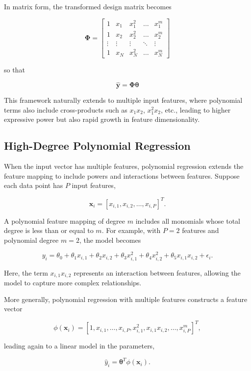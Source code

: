 \documentclass{article}
\begin{document}
In matrix form, the transformed design matrix becomes

\[
\mathbf{\Phi} =
\begin{bmatrix}
1 & x_1 & x_1^2 & \dots & x_1^m \\
1 & x_2 & x_2^2 & \dots & x_2^m \\
\vdots & \vdots & \vdots & \ddots & \vdots \\
1 & x_N & x_N^2 & \dots & x_N^m
\end{bmatrix}
\]

so that

\[
\hat{\mathbf{y}} = \mathbf{\Phi}\boldsymbol{\theta}
\]

This framework naturally extends to multiple input features, where polynomial terms also include cross-products such as $x_1 x_2$, $x_1^2 x_2$, etc., leading to higher expressive power but also rapid growth in feature dimensionality.

\subsection{High-Degree Polynomial Regression}

When the input vector has multiple features, polynomial regression extends the feature mapping to include powers and interactions between features. Suppose each data point has $P$ input features,

\[
\mathbf{x}_i = [x_{i,1}, x_{i,2}, \dots, x_{i,P}]^T.
\]

A polynomial feature mapping of degree $m$ includes all monomials whose total degree is less than or equal to $m$. For example, with $P = 2$ features and polynomial degree $m = 2$, the model becomes

\[
y_i = \theta_0 
+ \theta_1 x_{i,1} 
+ \theta_2 x_{i,2} 
+ \theta_3 x_{i,1}^2 
+ \theta_4 x_{i,2}^2 
+ \theta_5 x_{i,1} x_{i,2} 
+ \epsilon_i.
\]

Here, the term $x_{i,1}x_{i,2}$ represents an interaction between features, allowing the model to capture more complex relationships.

More generally, polynomial regression with multiple features constructs a feature vector

\[
\phi(\mathbf{x}_i) = 
[1, x_{i,1}, \dots, x_{i,P}, x_{i,1}^2, x_{i,1}x_{i,2}, \dots, x_{i,P}^m]^T,
\]

leading again to a linear model in the parameters,

\[
\hat{y}_i = \boldsymbol{\theta}^T \phi(\mathbf{x}_i).
\]
\end{document}
